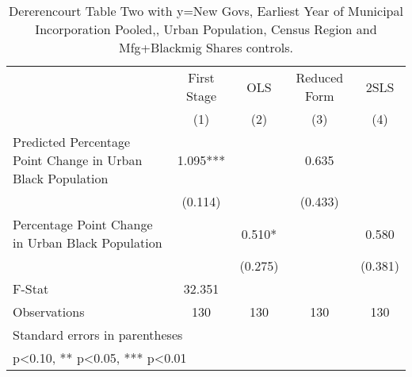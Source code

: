 \begin{table}[htbp]\centering
\def\sym#1{\ifmmode^{#1}\else\(^{#1}\)\fi}
\caption{Dererencourt Table Two with y=New Govs, Earliest Year of Municipal Incorporation  Pooled,, Urban Population, Census Region and Mfg+Blackmig Shares controls.}
\begin{tabular}{l*{4}{c}}
\toprule
                    & First Stage   &         OLS   &Reduced Form   &        2SLS   \\
                    &\multicolumn{1}{c}{(1)}   &\multicolumn{1}{c}{(2)}   &\multicolumn{1}{c}{(3)}   &\multicolumn{1}{c}{(4)}   \\
\midrule
Predicted Percentage Point Change in Urban Black Population&       1.095***&               &       0.635   &               \\
                    &     (0.114)   &               &     (0.433)   &               \\
\addlinespace
Percentage Point Change in Urban Black Population&               &       0.510*  &               &       0.580   \\
                    &               &     (0.275)   &               &     (0.381)   \\
\midrule
F-Stat              &      32.351   &               &               &               \\
Observations        &         130   &         130   &         130   &         130   \\
\bottomrule
\multicolumn{5}{l}{\footnotesize Standard errors in parentheses}\\
\multicolumn{5}{l}{\footnotesize * p<0.10, ** p<0.05, *** p<0.01}\\
\end{tabular}
\end{table}

